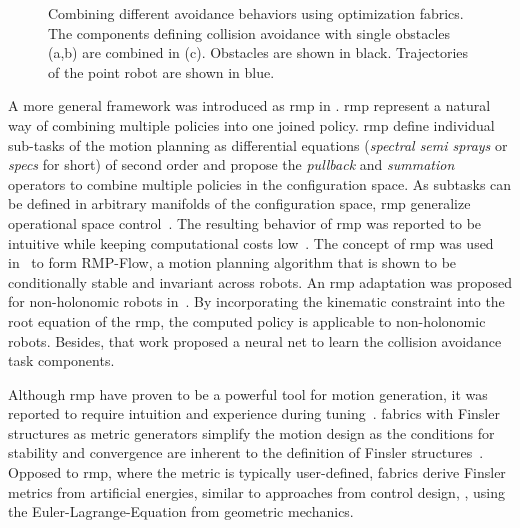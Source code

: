 %
\begin{figure}[h]
  \centering
  \begin{subfigure}{0.33\linewidth}
    \centering
    
    \caption{}
    \label{subfig:trajectory_obst1}
  \end{subfigure}%
  \begin{subfigure}{0.33\linewidth}
    \centering
    
    \caption{}
    \label{subfig:trajectory_obst2}
  \end{subfigure}%
  \begin{subfigure}{0.33\linewidth}
    \centering
    
    \caption{}
    \label{subfig:trajectory_both_obstacles}
  \end{subfigure}
  \caption{
    Combining different avoidance behaviors using optimization fabrics. The
    components defining collision avoidance with single obstacles (a,b) are
    combined in (c). Obstacles are shown in black. Trajectories of the point
    robot are shown in blue.
  }
  \label{fig:spec_combination}
\end{figure}
%
A more general framework was introduced as \acf{rmp} in
\cite{Ratliff2018,Cheng2018}. \Ac{rmp} represent a
natural way of combining multiple policies into one joined policy.
\ac{rmp} define individual sub-tasks of the motion planning as
differential equations (\textit{spectral semi sprays} or
\textit{specs} for short) of second order and propose the
\textit{pullback} and \textit{summation} operators to combine multiple policies
in the configuration space. As subtasks can be defined in arbitrary manifolds
of the configuration space, \ac{rmp} generalize operational space
control~\cite{Khatib1987}. The resulting behavior of
\ac{rmp} was reported to be
intuitive while keeping computational costs low~\cite{Ratliff2018}. The concept
of \ac{rmp} was used in~\cite{Cheng2018,Cheng2020} to form RMP-Flow, a motion
planning algorithm that is shown to be conditionally stable and invariant
across robots. An \ac{rmp} adaptation was proposed for non-holonomic robots
in~\cite{Meng2019}. By incorporating the kinematic constraint into the root
equation of the \ac{rmp}, the computed policy is applicable to non-holonomic robots.
Besides, that work proposed a neural net to learn the collision avoidance task
components. 

Although \ac{rmp} have proven to be a powerful tool for
motion generation, it was reported to require intuition and
experience during tuning~\cite{Ratliff2020}. \Acf{fabrics}
with Finsler structures as metric generators simplify the
motion design as the conditions for stability and
convergence are inherent to the definition of Finsler
structures~\cite{Ratliff2020,Ratliff2021}. Opposed to
\ac{rmp}, where the metric is typically user-defined,
fabrics derive Finsler metrics from artificial energies,
similar to approaches from control design, \cite{l2,l3},
using the Euler-Lagrange-Equation from geometric mechanics.

